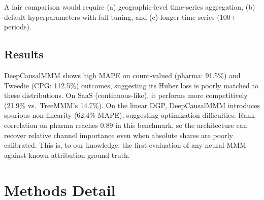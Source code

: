 \documentclass[review,12pt]{elsarticle}
\begin{document}
A fair comparison would require (a) geographic-level time-series aggregation,
(b) default hyperparameters with full tuning, and (c) longer time series
(100+ periods).

\subsection{Results}
\label{app:neural:results}

\begin{table}[ht]
\centering
\caption{Exploratory neural MMM comparison. DeepCausalMMM uses a 500-customer
         internal subsample; TreeMMM rows are the seed-42 reference benchmark
         from .}
\label{tab:app_deepcausal}
\end{table}

DeepCausalMMM shows high MAPE on count-valued (pharma: 91.5\%) and Tweedie
(CPG: 112.5\%) outcomes, suggesting its Huber loss is poorly matched to these
distributions. On SaaS (continuous-like), it performs more competitively
(21.9\% vs.\ TreeMMM's 14.7\%). On the linear DGP, DeepCausalMMM introduces
spurious non-linearity (62.4\% MAPE), suggesting optimization difficulties.
Rank correlation on pharma reaches 0.89 in this benchmark, so the architecture
can recover relative channel importance even when absolute shares are poorly
calibrated. This is, to our knowledge, the first evaluation of any neural MMM
against known attribution ground truth.

\section{Methods Detail}
\label{sec:methods}
\end{document}
